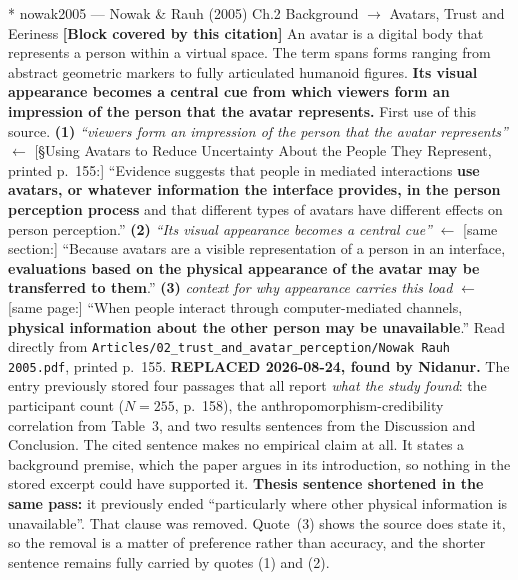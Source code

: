 \documentclass[11pt, a4paper]{article}
\makeatletter
\newcounter{citentry}
\newcommand{\citentry@core}[7]{%
  \stepcounter{citentry}
  \begingroup
  \sbox{\citentry@measurebox}{%
    \begin{minipage}{\linewidth}
      \noindent\colorbox{konstanzblue}{\parbox{\dimexpr\linewidth-2\fboxsep}{%
        \vspace{3pt}
        \textbf{\#\thecitentry \quad #2} \hfill \textit{#3}
        \vspace{3pt}
      }}
      \vspace{3pt}
      \noindent\begin{tabular}{@{}p{2.7cm} p{\dimexpr\linewidth-3cm}@{}}
        \textit{\small Sentence in thesis:} & #4 \\[5pt]
        \textbf{Usage:}\hfill       & #5 \\[5pt]
        \textit{\small Original source:}     & #6 \\[5pt]
        \textbf{How to check:}             & #7 \\
      \end{tabular}
      \vspace{5pt}
      \rule{10pt}{10pt}\quad \textbf{Validated} --- I have read the original and agree it supports the sentence.
    \end{minipage}%
  }%
  \Needspace{\dimexpr\ht\citentry@measurebox+\dp\citentry@measurebox\relax}%
  \endgroup
  \vspace{10pt}
  \noindent\colorbox{konstanzblue}{\parbox{\dimexpr\linewidth-2\fboxsep}{%
    \vspace{3pt}
    \textcolor{white}{\textbf{\#\thecitentry \quad #2}} \hfill \textcolor{white}{\textit{#3}}
    \vspace{3pt}
  }}
  \vspace{3pt}
  \noindent\begin{tabular}{@{}p{2.7cm} p{\dimexpr\linewidth-3cm}@{}}
    \textit{\small Sentence in thesis:} & \textcolor{darkgreen}{#4} \\[5pt]
    \textbf{Usage:}\hfill       & #5 \\[5pt]
    \textit{\small Original source:}     & \textcolor{darkred}{#6} \\[5pt]
    \textbf{How to check:}             & #7 \\
  \end{tabular}
  \vspace{5pt}
  \noindent\CheckBox[name=verified\thecitentry, width=10pt, height=10pt, bordercolor={0 0 0}, borderwidth=0.75, backgroundcolor={1 1 1}#1]{}\quad \textbf{Validated} --- I have read the original and agree it supports the sentence.
  \vspace{3pt}
  \noindent\textcolor{midgray}{\rule{\linewidth}{0.4pt}}
}
\newcommand{\citentry}{\@ifstar{\citentry@core{, checked}}{\citentry@core{}}}
\makeatother
\begin{document}
\begin{Form}
\citentry*
  {nowak2005 --- Nowak \& Rauh (2005)}
  {Ch.2 Background $\rightarrow$ Avatars, Trust and Eeriness}
  {\textbf{[Block covered by this citation]} An avatar is a digital body that represents a person within a virtual space. The term spans forms ranging from abstract geometric markers to fully articulated humanoid figures. \textbf{Its visual appearance becomes a central cue from which viewers form an impression of the person that the avatar represents.}}
  {First use of this source.}
  {\textbf{(1)} \emph{``viewers form an impression of the person that the avatar represents''} $\leftarrow$ [\S Using Avatars to Reduce Uncertainty About the People They Represent, printed p.~155:] ``Evidence suggests that people in mediated interactions \textbf{use avatars, or whatever information the interface provides, in the person perception process} and that different types of avatars have different effects on person perception.'' \quad \textbf{(2)} \emph{``Its visual appearance becomes a central cue''} $\leftarrow$ [same section:] ``Because avatars are a visible representation of a person in an interface, \textbf{evaluations based on the physical appearance of the avatar may be transferred to them}.'' \quad \textbf{(3)} \emph{context for why appearance carries this load} $\leftarrow$ [same page:] ``When people interact through computer-mediated channels, \textbf{physical information about the other person may be unavailable}.''}
  {Read directly from \texttt{\footnotesize Articles/02\_trust\_and\_avatar\_perception/Nowak Rauh 2005.pdf}, printed p.~155. \textbf{REPLACED 2026-08-24, found by Nidanur.} The entry previously stored four passages that all report \emph{what the study found}: the participant count ($N = 255$, p.~158), the anthropomorphism-credibility correlation from Table~3, and two results sentences from the Discussion and Conclusion. The cited sentence makes no empirical claim at all. It states a background premise, which the paper argues in its introduction, so nothing in the stored excerpt could have supported it. \textbf{Thesis sentence shortened in the same pass:} it previously ended ``particularly where other physical information is unavailable''. That clause was removed. Quote~(3) shows the source does state it, so the removal is a matter of preference rather than accuracy, and the shorter sentence remains fully carried by quotes (1) and (2).}


\end{Form}
\end{document}

